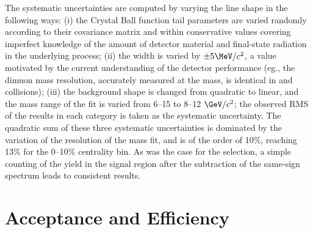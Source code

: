 The systematic uncertainties are computed by varying the line shape in
the following ways: (i) the Crystal Ball function tail parameters are
varied randomly according to their covariance matrix and within
conservative values covering imperfect knowledge of the amount of
detector material and final-state radiation in the underlying process;
(ii) the width is varied by $\pm 5\MeV/c^2$, a value motivated by the
current understanding of the detector performance (eg., the dimuon
mass resolution, accurately measured at the \Jpsi mass, is identical
in \pp and \PbPb collisions); (iii) the background shape is changed
from quadratic to linear, and the mass range of the fit is varied from
6--15 to 8--12 $\GeV/c^2$; the observed RMS of the results in each category
is taken as the systematic uncertainty. The quadratic sum of these
three systematic uncertainties is dominated by the variation of the
resolution of the mass fit, and is of the order of 10\%, reaching 13\%
for the 0--10\% centrality bin. As was the case for the \Jpsi
selection, a simple counting of the yield in the signal region after
the subtraction of the same-sign spectrum leads to consistent results.


\section{Acceptance and Efficiency}
\label{sec:acceff}
